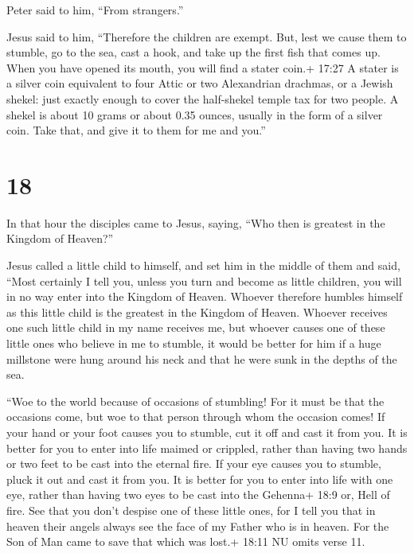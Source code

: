  Peter said to him, ``From strangers.''

Jesus said to him, ``Therefore the children are exempt. 
But, lest we cause them to stumble, go to the sea, cast a hook, and take
up the first fish that comes up. When you have opened its mouth, you
will find a stater coin.+ 17:27 A stater is a silver coin equivalent to
four Attic or two Alexandrian drachmas, or a Jewish shekel: just exactly
enough to cover the half-shekel temple tax for two people. A shekel is
about 10 grams or about 0.35 ounces, usually in the form of a silver
coin. Take that, and give it to them for me and you.''

\hypertarget{section-17}{%
\section{18}\label{section-17}}

 In that hour the disciples came to Jesus, saying, ``Who
then is greatest in the Kingdom of Heaven?''

 Jesus called a little child to himself, and set him in the
middle of them  and said, ``Most certainly I tell you,
unless you turn and become as little children, you will in no way enter
into the Kingdom of Heaven.  Whoever therefore humbles
himself as this little child is the greatest in the Kingdom of Heaven.
 Whoever receives one such little child in my name receives
me,  but whoever causes one of these little ones who believe
in me to stumble, it would be better for him if a huge millstone were
hung around his neck and that he were sunk in the depths of the sea.

 ``Woe to the world because of occasions of stumbling! For
it must be that the occasions come, but woe to that person through whom
the occasion comes!  If your hand or your foot causes you to
stumble, cut it off and cast it from you. It is better for you to enter
into life maimed or crippled, rather than having two hands or two feet
to be cast into the eternal fire.  If your eye causes you to
stumble, pluck it out and cast it from you. It is better for you to
enter into life with one eye, rather than having two eyes to be cast
into the Gehenna+ 18:9 or, Hell of fire.  See that you
don't despise one of these little ones, for I tell you that in heaven
their angels always see the face of my Father who is in heaven.
 For the Son of Man came to save that which was lost.+
18:11 NU omits verse 11.

